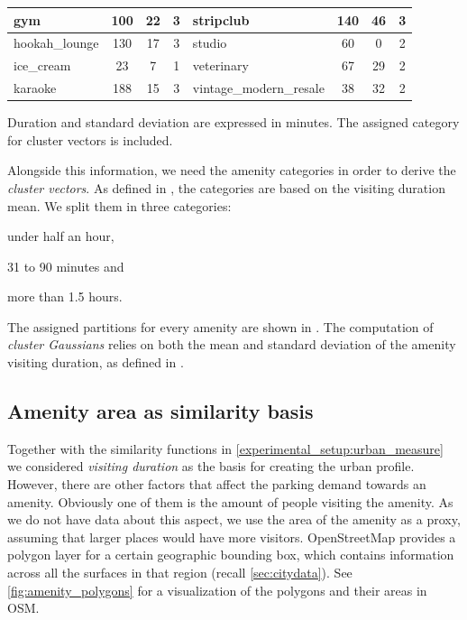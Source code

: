 \begin{table}[!ht]
{\begin{tabular}{ | l | c | c | c || l | c | c | c |}
		gym  & 100 & 22 & 3 &  stripclub  & 140 & 46 & 3 \\ \hline
		hookah\_lounge  & 130 & 17 & 3 &  studio  & 60 & 0 & 2 \\ \hline
		ice\_cream  & 23 & 7 & 1 &  veterinary  & 67 & 29 & 2 \\ \hline
		karaoke  & 188 & 15 & 3 & {\scriptsize vintage\_modern\_resale}  & 38 & 32 & 2 \\ \hline
	\end{tabular}}
	\label{tab:amenities_google_places}
	\begin{tabnote}
		Duration and standard deviation are expressed in minutes. The assigned category for cluster vectors is included.
	\end{tabnote}
\end{table}

Alongside this information, we need the amenity categories in order to derive the \textit{cluster vectors}.
As defined in , the categories are based on the visiting duration mean.
We split them in three categories: 
\begin{romanlist}
	\item under half an hour,
	\item 31 to 90 minutes and
	\item more than 1.5 hours. 
\end{romanlist}
The assigned partitions for every amenity are shown in . 
The computation of \textit{cluster Gaussians} relies on both the mean and standard deviation of the amenity visiting duration, as defined in .

\subsection{Amenity area as similarity basis}
\label{experimental_setup:amenity_area}
Together with the similarity functions in \cref{experimental_setup:urban_measure} we considered \textit{visiting duration} as the basis for creating the urban profile. However, there are other factors that affect the parking demand towards an amenity.
Obviously one of them is the amount of people visiting the amenity.
As we do not have data about this aspect, we use the area of the amenity as a proxy, assuming that larger places would have more visitors.
OpenStreetMap provides a polygon layer for a certain geographic bounding box, which contains information across all the surfaces in that region (recall \cref{sec:citydata}). See \cref{fig:amenity_polygons} for a visualization of the polygons and their areas in OSM. 

